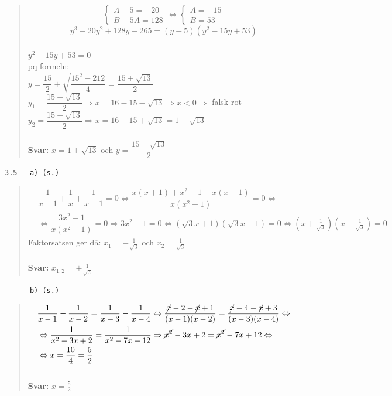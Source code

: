 \documentclass[a4paper]{article}
\newcommand{\tskcol}[1]{\textcolor{tskcol}{#1}}
\begin{document}
\begin{quotation}
		\[\begin{cases}
		A-5=-20 \\
		B-5A=128
		\end{cases}
		\Leftrightarrow
		\begin{cases}
		A=-15 \\
		B=53
		\end{cases}\]
		\[y^3-20y^2+128y-265=(y-5)(y^2-15y+53)\] \\
		$y^2-15y+53=0$ \\
		pq-formeln: \\
		$y=\dfrac{15}{2}\pm\sqrt{\dfrac{15^2-212}{4}}=\dfrac{15\pm\sqrt{13}}{2}$ \\
		$y_1=\dfrac{15+\sqrt{13}}{2} \Rightarrow 
		x=16-15-\sqrt{13} \Rightarrow 
		x < 0 \Rightarrow$ falsk rot \\
		$y_2=\dfrac{15-\sqrt{13}}{2} \Rightarrow x=16-15+\sqrt{13}=1+\sqrt{13}$ \\ \\
		\textbf{Svar:} $x=1+\sqrt{13}$ och $y=\dfrac{15-\sqrt{13}}{2}$
	\end{quotation}
	
	\pagebreak
	\texttt{\tskcol{3.5~~~a) (s.)}}
	\begin{quotation}
		\noindent
		\begin{align*}
		&\dfrac{1}{x-1}+\dfrac{1}{x}+\dfrac{1}{x+1}=0\Leftrightarrow
		\dfrac{x(x+1)+x^2-1+x(x-1)}{x(x^2-1)}=0 \Leftrightarrow \\
		&\Leftrightarrow \dfrac{3x^2-1}{x(x^2-1)}=0\Rightarrow 
		3x^2-1=0 \Leftrightarrow 
		(\sqrt{3}x+1)(\sqrt{3}x-1)=0 \Leftrightarrow
		(x+\frac{1}{\sqrt{3}})(x-\frac{1}{\sqrt{3}})=0
		\end{align*}
		Faktorsatsen ger då: $x_1=-\frac{1}{\sqrt{3}}$ och $x_2=\frac{1}{\sqrt{3}}$
		\\ \\
		\textbf{Svar:} $x_{1,2}=\pm\frac{1}{\sqrt{3}}$
	\end{quotation}
	
	\texttt{\tskcol{~~~~~~b) (s.)}}
	\begin{quotation}
		\noindent
		\begin{align*}
		&\dfrac{1}{x-1}-\dfrac{1}{x-2}=\dfrac{1}{x-3}-\dfrac{1}{x-4}\Leftrightarrow 
		\dfrac{\cancel{x}-2-\cancel{x}+1}{(x-1)(x-2)}=\dfrac{\cancel{x}-4-\cancel{x}+3}{(x-3)(x-4)} \Leftrightarrow \\
		&\Leftrightarrow \dfrac{1}{x^2-3x+2}=\dfrac{1}{x^2-7x+12} \Rightarrow
		\cancel{x^2}-3x+2=\cancel{x^2}-7x+12 \Leftrightarrow \\
		&\Leftrightarrow x=\frac{10}{4}=\frac{5}{2}
		\end{align*}
		\\
		\textbf{Svar:} $x=\frac{5}{2}$
	\end{quotation}
	
\end{document}
